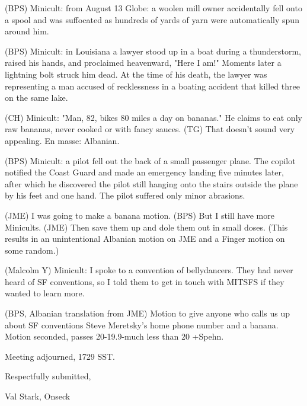 \documentclass[12pt]{article}
\begin{document}
(BPS) Minicult: from August 13 Globe: a woolen mill owner accidentally fell onto a spool and was suffocated as hundreds of yards of yarn were automatically spun around him.

(BPS) Minicult: in Louisiana a lawyer stood up in a boat during a thunderstorm, raised his hands, and proclaimed heavenward, "Here I am!" Moments later a lightning bolt struck him dead. At the time of his death, the lawyer was representing a man accused of recklessness in a boating accident that killed three on the same lake.

(CH) Minicult: "Man, 82, bikes 80 miles a day on bananas." He claims to eat only raw bananas, never cooked or with fancy sauces. (TG) That doesn't sound very appealing. En masse: Albanian.

(BPS) Minicult: a pilot fell out the back of a small passenger plane. The copilot notified the Coast Guard and made an emergency landing five minutes later, after which he discovered the pilot still hanging onto the stairs outside the plane by his feet and one hand. The pilot suffered only minor abrasions.

(JME) I was going to make a banana motion. (BPS) But I still have more Minicults. (JME) Then save them up and dole them out in small doses. (This results in an unintentional Albanian motion on JME and a Finger motion on some random.)

(Malcolm Y) Minicult: I spoke to a convention of bellydancers. They had never heard of SF conventions, so I told them to get in touch with MITSFS if they wanted to learn more.

(BPS, Albanian translation from JME) Motion to give anyone who calls us up about SF conventions Steve Meretsky's home phone number and a banana. Motion seconded, passes 20-19.9-much less than 20 +Spehn.

\vspace{12pt}

\noindent
Meeting adjourned, 1729 SST.

\vspace{18pt}

\centerline{Respectfully submitted,}
\centerline{Val Stark, Onseck}
\end{document}
